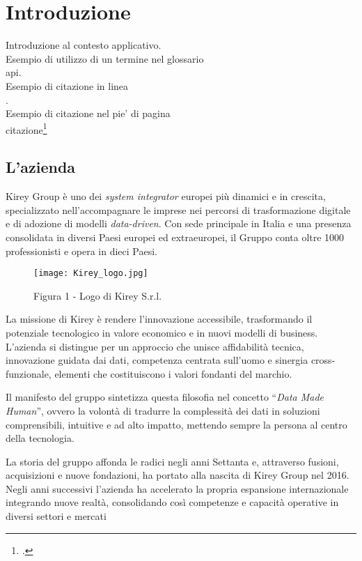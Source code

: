 \chapter{Introduzione}
\label{cap:introduzione}

Introduzione al contesto applicativo.\\

\noindent Esempio di utilizzo di un termine nel glossario \\
\gls{api}. \\

\noindent Esempio di citazione in linea \\
\cite{site:agile-manifesto}. \\

\noindent Esempio di citazione nel pie' di pagina \\
citazione\footcite{womak:lean-thinking} \\

\section{L'azienda}
Kirey Group è uno dei \emph{system integrator} europei più dinamici e in crescita, specializzato nell'accompagnare le imprese nei percorsi di trasformazione digitale
 e di adozione di modelli \emph{data-driven}. Con sede principale in Italia e una presenza consolidata in diversi Paesi europei ed extraeuropei, 
 il Gruppo conta oltre 1000 professionisti e opera in dieci Paesi.

\begin{figure}[!h] 
    \centering 
    \texttt{[image: Kirey\_logo.jpg]} 
    \caption{Figura 1 - Logo di Kirey S.r.l.}
\end{figure}

La missione di Kirey è rendere l'innovazione accessibile, trasformando il potenziale tecnologico in valore economico e in nuovi modelli di business. 
L'azienda si distingue per un approccio che unisce affidabilità tecnica, innovazione guidata dai dati, competenza centrata sull'uomo e sinergia cross-funzionale, 
elementi che costituiscono i valori fondanti del marchio.

Il manifesto del gruppo sintetizza questa filosofia nel concetto “\emph{Data Made Human}”, ovvero la volontà di tradurre la complessità dei dati in soluzioni comprensibili, 
intuitive e ad alto impatto, mettendo sempre la persona al centro della tecnologia.

La storia del gruppo affonda le radici negli anni Settanta e, attraverso fusioni, acquisizioni e nuove fondazioni, ha portato alla nascita di Kirey Group nel 2016. 
Negli anni successivi l'azienda ha accelerato la propria espansione internazionale integrando nuove realtà, consolidando così competenze e capacità operative in diversi settori e mercati

